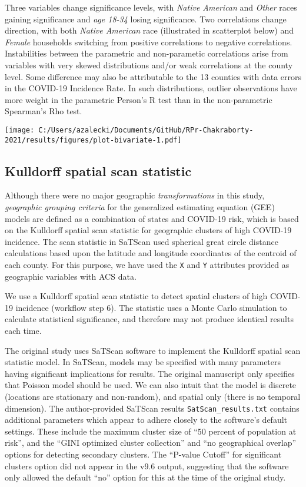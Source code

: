 \documentclass[
]{article}
\begin{document}
Three variables change significance levels, with \emph{Native American}
and \emph{Other} races gaining significance and \emph{age 18-34} losing
significance. Two correlations change direction, with both \emph{Native
American} race (illustrated in scatterplot below) and \emph{Female}
households switching from positive correlations to negative
correlations. Instabilities between the parametric and non-parametic
correlations arise from variables with very skewed distributions and/or
weak correlations at the county level. Some difference may also be
attributable to the 13 counties with data errors in the COVID-19
Incidence Rate. In such distributions, outlier observations have more
weight in the parametric Person's R test than in the non-parametric
Spearman's Rho test.

\texttt{[image: C:/Users/azalecki/Documents/GitHub/RPr-Chakraborty-2021/results/figures/plot-bivariate-1.pdf]}

\hypertarget{kulldorff-spatial-scan-statistic}{%
\subsection{Kulldorff spatial scan
statistic}\label{kulldorff-spatial-scan-statistic}}

Although there were no major geographic \emph{transformations} in this
study, \emph{geographic grouping criteria} for the generalized
estimating equation (GEE) models are defined as a combination of states
and COVID-19 risk, which is based on the Kulldorff spatial scan
statistic for geographic clusters of high COVID-19 incidence. The scan
statistic in SaTScan used spherical great circle distance calculations
based upon the latitude and longitude coordinates of the centroid of
each county. For this purpose, we have used the \texttt{X} and
\texttt{Y} attributes provided as geographic variables with ACS data.

We use a Kulldorff spatial scan statistic to detect spatial clusters of
high COVID-19 incidence (workflow step 6). The statistic uses a Monte
Carlo simulation to calculate statistical significance, and therefore
may not produce identical results each time.

The original study uses SaTScan software to implement the Kulldorff
spatial scan statistic model. In SaTScan, models may be specified with
many parameters having significant implications for results. The
original manuscript only specifies that Poisson model should be used. We
can also intuit that the model is discrete (locations are stationary and
non-random), and spatial only (there is no temporal dimension). The
author-provided SaTScan results \texttt{SatScan\_results.txt} contains
additional parameters which appear to adhere closely to the software's
default settings. These include the maximum cluster size of ``50 percent
of population at risk'', and the ``GINI optimized cluster collection''
and ``no geographical overlap'' options for detecting secondary
clusters. The ``P-value Cutoff'' for significant clusters option did not
appear in the v9.6 output, suggesting that the software only allowed the
default ``no'' option for this at the time of the original study.
\end{document}
